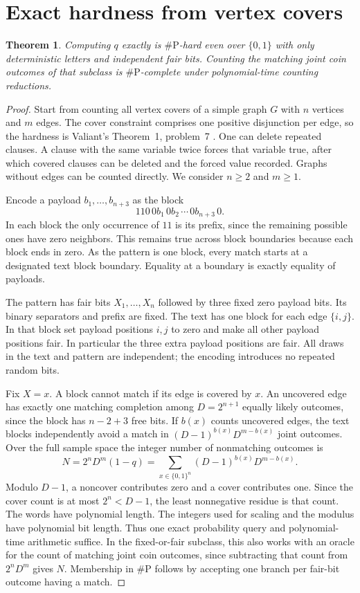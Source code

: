 \documentclass[11pt,a4paper]{amsart}
\newtheorem{theorem}{Theorem}
\newcommand{\sharpP}{\#\mathrm{P}}
\begin{document}
\section{Exact hardness from vertex covers}
\begin{theorem}
Computing $q$ exactly is $\sharpP$-hard even over $\{0,1\}$ with only deterministic letters and independent fair bits. Counting the matching joint coin outcomes of that subclass is $\sharpP$-complete under polynomial-time counting reductions.
\end{theorem}
\begin{proof}
Start from counting all vertex covers of a simple graph $G$ with $n$ vertices and $m$ edges. The cover constraint comprises one positive disjunction per edge, so the hardness is Valiant's Theorem~1, problem~7 \cite{valiant}. One can delete repeated clauses. A clause with the same variable twice forces that variable true, after which covered clauses can be deleted and the forced value recorded. Graphs without edges can be counted directly. We consider $n\ge2$ and $m\ge1$.

Encode a payload $b_1,\ldots,b_{n+3}$ as the block
\[
             110\,0b_1\,0b_2\,\cdots\,0b_{n+3}\,0 .
\]
In each block the only occurrence of $11$ is its prefix, since the remaining possible ones have zero neighbors. This remains true across block boundaries because each block ends in zero. As the pattern is one block, every match starts at a designated text block boundary. Equality at a boundary is exactly equality of payloads.

The pattern has fair bits $X_1,\ldots,X_n$ followed by three fixed zero payload bits. Its binary separators and prefix are fixed. The text has one block for each edge $\{i,j\}$. In that block set payload positions $i,j$ to zero and make all other payload positions fair. In particular the three extra payload positions are fair. All draws in the text and pattern are independent; the encoding introduces no repeated random bits.

Fix $X=x$. A block cannot match if its edge is covered by $x$. An uncovered edge has exactly one matching completion among $D=2^{n+1}$ equally likely outcomes, since the block has $n-2+3$ free bits. If $b(x)$ counts uncovered edges, the text blocks independently avoid a match in $(D-1)^{b(x)}D^{m-b(x)}$ joint outcomes. Over the full sample space the integer number of nonmatching outcomes is
\[
   N=2^nD^m(1-q)
     =\sum_{x\in\{0,1\}^n}(D-1)^{b(x)}D^{m-b(x)} .
\]
Modulo $D-1$, a noncover contributes zero and a cover contributes one. Since the cover count is at most $2^n<D-1$, the least nonnegative residue is that count. The words have polynomial length. The integers used for scaling and the modulus have polynomial bit length. Thus one exact probability query and polynomial-time arithmetic suffice. In the fixed-or-fair subclass, this also works with an oracle for the count of matching joint coin outcomes, since subtracting that count from $2^nD^m$ gives $N$. Membership in $\sharpP$ follows by accepting one branch per fair-bit outcome having a match.
\end{proof}
\end{document}

